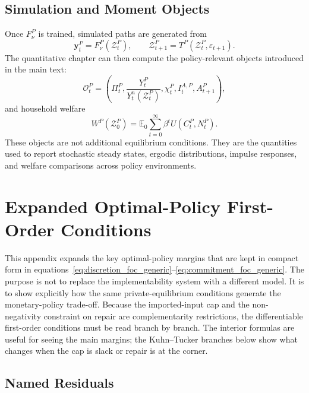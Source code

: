 ﻿\documentclass[12pt]{article}
\theoremstyle{remark}
\newcommand{\E}{\mathbb E}
\begin{document}
\subsection{Simulation and Moment Objects}

Once $F_\nu^P$ is trained, simulated paths are generated from
\begin{equation}
    \mathbf y_t^P=F_\nu^P(\mathcal Z_t^P),
    \qquad
    \mathcal Z_{t+1}^P=T^P(\mathcal Z_t^P,\varepsilon_{t+1}).
    \label{eq:app_deqn_simulation_law}
\end{equation}
The quantitative chapter can then compute the policy-relevant objects introduced in the main text:
\begin{equation}
    \mathcal O_t^P
    =
    \left(
        \Pi_t^P,
        \frac{Y_t^P}{Y_t^n(\mathcal Z_t^P)},
        \chi_t^P,
        I_t^{A,P},
        A_{t+1}^P
    \right),
    \label{eq:app_deqn_outcome_vector}
\end{equation}
and household welfare
\begin{equation}
    W^P(\mathcal Z_0^P)
    =
    \E_0
    \sum_{t=0}^{\infty}
    \beta^tU(C_t^P,N_t^P).
    \label{eq:app_deqn_welfare}
\end{equation}
These objects are not additional equilibrium conditions. They are the quantities used to report
stochastic steady states, ergodic distributions, impulse responses, and welfare comparisons across
policy environments.

\section{Expanded Optimal-Policy First-Order Conditions}
\label{app:expanded_optimal_policy_focs}

This appendix expands the key optimal-policy margins that are kept in compact form in
equations~\eqref{eq:discretion_foc_generic}--\eqref{eq:commitment_foc_generic}. The purpose is not to
replace the implementability system with a different model. It is to show explicitly how the same
private-equilibrium conditions generate the monetary-policy trade-off. Because the imported-input
cap and the non-negativity constraint on repair are complementarity restrictions, the differentiable
first-order conditions must be read branch by branch. The interior formulas are useful for seeing
the main margins; the Kuhn--Tucker branches below show what changes when the cap is slack or repair
is at the corner.

\subsection{Named Residuals}
\end{document}
